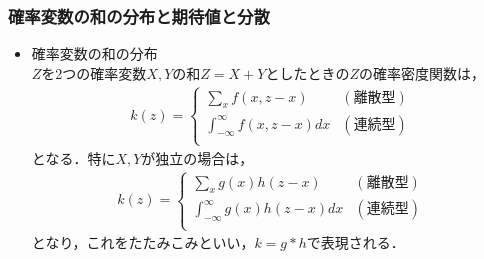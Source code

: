 \documentclass[autodetect-engine,dvipdfmx-if-dvi,ja=standard,a4paper,11pt]{bxjsarticle} %
\begin{document}
\subsubsection{確率変数の和の分布と期待値と分散}
\begin{itemize}
\item 確率変数の和の分布\\
 $Z$を2つの確率変数$X,Y$の和$Z=X+Y$としたときの$Z$の確率密度関数は，
\begin{eqnarray}
\label{wonoiki}
k(z)=\left\{ \begin{array}{ll}
\displaystyle\sum_{x}f(x,z-x) &  (\mbox{離散型}) \\
\displaystyle\int_{-\infty}^{\infty}f(x,z-x)dx & (\mbox{連続型}) \\
\end{array} \right.
\end{eqnarray}
となる．特に$X,Y$が独立の場合は，
\begin{eqnarray}
k(z)=\left\{ \begin{array}{ll}
\displaystyle\sum_{x}g(x)h(z-x) &  (\mbox{離散型}) \\
\displaystyle\int_{-\infty}^{\infty}g(x)h(z-x)dx & (\mbox{連続型}) \\
\end{array} \right.
\end{eqnarray}
となり，これをたたみこみといい，$k=g*h$で表現される．


\end{itemize}
\end{document}
